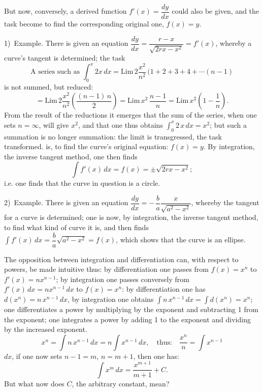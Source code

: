\documentclass[12pt]{book}
\begin{document}
But now, conversely, a derived function $f'(x) = \dfrac{dy}{dx}$ could also be given,
and the task become to find the corresponding original one, $f(x) = y$.

1)~Example. There is given an equation
$\dfrac{dy}{dx} = \dfrac{r-x}{\sqrt{2rx-x^{2}}} = f'(x)$, whereby a curve's tangent is
determined; the task
\[
\text{A series such as }\int_{0}^{x} 2x\,dx
  = \mathrm{Lim}\,2\frac{x^{2}}{n^{2}}\,(1+2+3+4+\cdots (n-1)
\]
is not summed, but reduced:
\[
= \mathrm{Lim}\,2\frac{x^{2}}{n^{2}}\left(\frac{(n-1)\,n}{2}\right)
= \mathrm{Lim}\,x^{2}\,\frac{n-1}{n}
= \mathrm{Lim}\,x^{2}\left(1-\frac{1}{n}\right).
\]
From the result of the reductions it emerges that the sum of the series, when one
sets $n = \infty$, will give $x^{2}$, and that one thus obtains
$\int_{0}^{x} 2\,x\,dx = x^{2}$; but such a summation is no longer summation: the
limit is transgressed, the task transformed.
is, to find the curve's original equation: $f(x) = y$. By integration, the inverse
tangent method, one then finds
\[
\int f'(x)\,dx = f(x) = \pm\sqrt{2rx-x^{2}};
\]
i.e. one finds that the curve in question is a circle.

2)~Example. There is given an equation
$\dfrac{dy}{dx} = -\,\dfrac{b}{a}\dfrac{x}{\sqrt{a^{2}-x^{2}}}$, whereby the tangent
for a curve is determined; one is now, by integration, the inverse tangent method, to
find what kind of curve it is, and then finds
$\int f'(x)\,dx = \dfrac{b}{a}\sqrt{a^{2}-x^{2}} = f(x)$, which shows that the curve is
an ellipse.

The opposition between integration and differentiation can, with respect to powers,
be made intuitive thus: by differentiation one passes from $f(x) = x^{n}$ to
$f'(x) = nx^{n-1}$; by integration one passes conversely from
$f'(x)\,dx = nx^{n-1}\,dx$ to $f(x) = x^{n}$: by differentiation one has
$d(x^{n}) = n\,x^{n-1}\,dx$, by integration one obtains
$\int n\,x^{n-1}\,dx = \int d(x^{n}) = x^{n}$; one differentiates a power by
multiplying by the exponent and subtracting 1 from the exponent; one integrates a
power by adding 1 to the exponent and dividing by the increased exponent.
\[
x^{n} = \int n\,x^{n-1}\,dx = n\int x^{n-1}\,dx, \quad\text{thus:}\quad
\frac{x^{n}}{n} = \int x^{n-1}
\]
$dx$, if one now sets $n-1 = m$, $n = m+1$, then one has:
\[
\int x^{m}\,dx = \frac{x^{m+1}}{m+1} + C.
\]
But what now does $C$, the arbitrary constant, mean?
\end{document}
